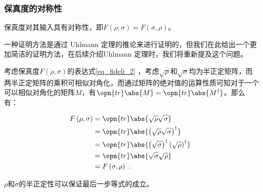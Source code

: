 \subsubsection{保真度的对称性}

保真度对其输入具有对称性，即$F\left(\rho,\sigma\right) = F\left(\sigma,\rho\right)$。

一种证明方法是通过 Uhlmann 定理的推论来进行证明的，但我们在此给出一个更加简洁的证明方法，在后续介绍Uhlmann 定理时，我们将重新提及这个问题。 

考虑保真度$F\left(\rho,\sigma\right)$的表达式\autoref{eq_fideli_2} ，考虑$\sqrt{\rho}$和$\sqrt{\sigma}$均为半正定矩阵，而两半正定矩阵的乘积可相似对角化，而通过矩阵的绝对值的运算性质可知对于一个可以相似对角化的矩阵$M$，有$\opn{tr}\abs{M} = \opn{tr}\abs{M^\dagger}$。那么有：

\begin{equation}
\begin{aligned}
F\left(\rho,\sigma\right) &= \opn{tr}\abs{\sqrt{\rho}\sqrt{\sigma}} \\
&= \opn{tr}\abs{\left(\sqrt{\rho}\sqrt{\sigma}\right)^\dagger} \\
&= \opn{tr}\abs{\left(\sqrt{\sigma}\right)^\dagger\left(\sqrt{\rho}\right)^\dagger} \\
&= \opn{tr}\abs{\sqrt{\sigma}\sqrt{\rho}}  \\
&= F\left(\sigma,\rho\right)~.
\end{aligned}~
\end{equation}

$\rho$和$\sigma$的半正定性可以保证最后一步等式的成立。
